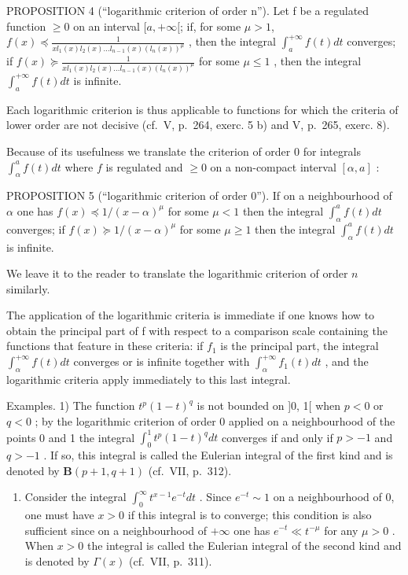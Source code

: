 PROPOSITION 4 (``logarithmic criterion of order n''). Let f be a regulated function \(\geqslant0\) on an interval \([a,+\infty[\); if, for some \(\mu>1\), \(f(x)\preccurlyeq\frac{1}{xl_{1}(x)l_{2}(x)\ldots l_{n-1}(x)(l_{n}(x))^{\mu}}\) , then the integral \(\int_{a}^{+\infty}f(t)dt\) converges; if \(f(x)\succcurlyeq\frac{1}{xl_{1}(x)l_{2}(x)\ldots l_{n-1}(x)(l_{n}(x))^{\mu}}\) for some \(\mu\leqslant1\) , then the integral \(\int_{a}^{+\infty}f(t)dt\) is infinite.

Each logarithmic criterion is thus applicable to functions for which the criteria of lower order are not decisive (cf.~V, p.~264, exerc. 5 b) and V, p.~265, exerc. 8).

Because of its usefulness we translate the criterion of order 0 for integrals \(\int_{\alpha}^{a}f(t)dt\) where \(f\) is regulated and \(\geqslant 0\) on a non-compact interval \([\alpha ,a]\) :

PROPOSITION 5 (``logarithmic criterion of order 0''). If on a neighbourhood of \(\alpha\) one has \(f(x) \preccurlyeq 1/(x - \alpha)^{\mu}\) for some \(\mu < 1\) then the integral \(\int_{\alpha}^{a} f(t) dt\) converges; if \(f(x) \succcurlyeq 1/(x - \alpha)^{\mu}\) for some \(\mu \geqslant 1\) then the integral \(\int_{\alpha}^{a} f(t) dt\) is infinite.

We leave it to the reader to translate the logarithmic criterion of order \(n\) similarly.

The application of the logarithmic criteria is immediate if one knows how to obtain the principal part of f with respect to a comparison scale containing the functions that feature in these criteria: if \(f_{1}\) is the principal part, the integral \(\int_{\alpha}^{+\infty} f(t) dt\) converges or is infinite together with \(\int_{\alpha}^{+\infty} f_{1}(t) dt\) , and the logarithmic criteria apply immediately to this last integral.

Examples. 1) The function \(t^p (1 - t)^q\) is not bounded on {]}0, 1{[} when \(p < 0\) or \(q < 0\) ; by the logarithmic criterion of order 0 applied on a neighbourhood of the points 0 and 1 the integral \(\int_0^1 t^p (1 - t)^q dt\) converges if and only if \(p > -1\) and \(q > -1\) . If so, this integral is called the Eulerian integral of the first kind and is denoted by \(\mathbf{B}(p + 1,q + 1)\) (cf.~VII, p.~312).

\begin{enumerate}
\def\labelenumi{\arabic{enumi})}
\setcounter{enumi}{1}
\tightlist
\item
  Consider the integral \(\int_0^\infty t^{x - 1}e^{-t}dt\) . Since \(e^{-t}\sim 1\) on a neighbourhood of 0, one must have \(x > 0\) if this integral is to converge; this condition is also sufficient since on a neighbourhood of \(+\infty\) one has \(e^{-t}\ll t^{-\mu}\) for any \(\mu >0\) . When \(x > 0\) the integral is called the Eulerian integral of the second kind and is denoted by \(\Gamma (x)\) (cf.~VII, p.~311).
\end{enumerate}

